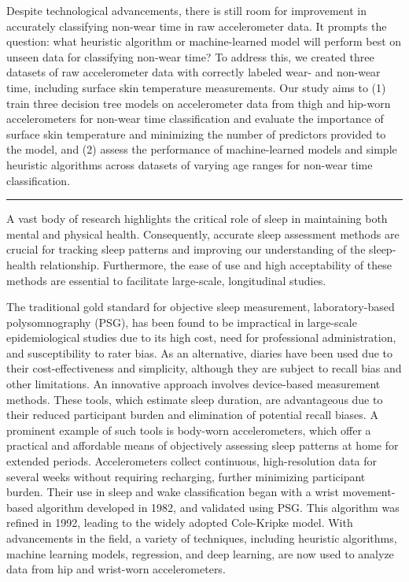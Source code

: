 \documentclass[
  10pt,
  letterpaper,
  DIV=11,
  numbers=noendperiod]{scrartcl}
\begin{document}
Despite technological advancements, there is still room for improvement
in accurately classifying non-wear time in raw accelerometer data. It
prompts the question: what heuristic algorithm or machine-learned model
will perform best on unseen data for classifying non-wear time? To
address this, we created three datasets of raw accelerometer data with
correctly labeled wear- and non-wear time, including surface skin
temperature measurements. Our study aims to (1) train three decision
tree models on accelerometer data from thigh and hip-worn accelerometers
for non-wear time classification and evaluate the importance of surface
skin temperature and minimizing the number of predictors provided to the
model, and (2) assess the performance of machine-learned models and
simple heuristic algorithms across datasets of varying age ranges for
non-wear time classification.

\begin{center}\rule{0.5\linewidth}{0.5pt}\end{center}

A vast body of research highlights the critical role of sleep in
maintaining both mental and physical
health\autocite{ma_sleep_2017,meyer_circadian_2022,k_pavlova_sleep_2019,difrancesco_sleep_2019}.
Consequently, accurate sleep assessment methods are crucial for tracking
sleep patterns and improving our understanding of the sleep-health
relationship. Furthermore, the ease of use and high acceptability of
these methods are essential to facilitate large-scale, longitudinal
studies.

The traditional gold standard for objective sleep measurement,
laboratory-based polysomnography (PSG), has been found to be impractical
in large-scale epidemiological studies due to its high cost, need for
professional administration, and susceptibility to rater
bias\autocite{van_de_water_objective_2011,lee_interrater_2022}. As an
alternative, diaries have been used due to their cost-effectiveness and
simplicity, although they are subject to recall bias and other
limitations\autocite{moore_actigraphy_2015}. An innovative approach
involves device-based measurement methods. These tools, which estimate
sleep duration, are advantageous due to their reduced participant burden
and elimination of potential recall biases. A prominent example of such
tools is body-worn accelerometers, which offer a practical and
affordable means of objectively assessing sleep patterns at home for
extended periods. Accelerometers collect continuous, high-resolution
data for several weeks without requiring recharging, further minimizing
participant burden. Their use in sleep and wake classification began
with a wrist movement-based algorithm developed in 1982, and validated
using PSG\autocite{webster_activity-based_1982}. This algorithm was
refined in 1992\autocite{cole_automatic_1992}, leading to the widely
adopted Cole-Kripke model. With advancements in the field, a variety of
techniques, including heuristic algorithms, machine learning models,
regression, and deep learning, are now used to analyze data from hip and
wrist-worn
accelerometers\autocite{palotti_benchmark_2019,cole_automatic_1992,sazonov_activity-based_2004,sadeh_activity-based_1994,hees_novel_2015,sundararajan_sleep_2021}.
\end{document}

